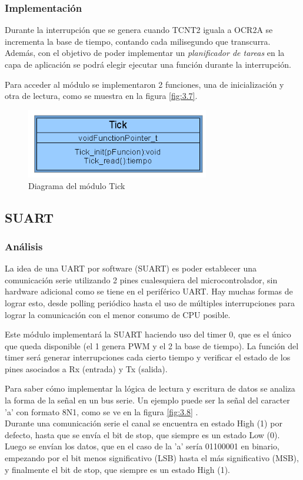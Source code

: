 \subsubsection{Implementación}

Durante la interrupción que se genera cuando TCNT2 iguala a OCR2A se incrementa la base de tiempo, contando cada milisegundo que transcurra. Además, con el objetivo de poder implementar un \textit{planificador de tareas} en la capa de aplicación se podrá elegir ejecutar una función durante la interrupción.

Para acceder al módulo se implementaron 2 funciones, una de inicialización y otra de lectura, como se muestra en la figura \ref{fig:3.7}.

\begin{figure}[!ht]
	\centering
	\includegraphics[width=8cm,scale=1]{resources/3_7-moduloTick.png}
	\caption{Diagrama del módulo Tick}
	\label{fig:\thefigure}
\end{figure}

\subsection{SUART}
\subsubsection{Análisis}
La idea de una UART por software (SUART) es poder establecer una comunicación serie utilizando 2 pines cualesquiera del microcontrolador, sin hardware adicional como se tiene en el periférico UART. Hay muchas formas de lograr esto, desde polling periódico hasta el uso de múltiples interrupciones para lograr la comunicación con el menor consumo de CPU posible. 

Este módulo implementará la SUART haciendo uso del timer 0, que es el único que queda disponible (el 1 genera PWM y el 2 la base de tiempo). La función del timer será generar interrupciones cada cierto tiempo y verificar el estado de los pines asociados a Rx (entrada) y Tx (salida). 

Para saber cómo implementar la lógica de lectura y escritura de datos se analiza la forma de la señal en un bus serie. Un ejemplo puede ser la señal del caracter 'a' con formato 8N1, como se ve en la figura  \ref{fig:3.8} . \\
Durante una comunicación serie el canal se encuentra en estado High (1) por defecto, hasta que se envía el bit de stop, que siempre es un estado Low (0). Luego se envían los datos, que en el caso de la 'a' sería 01100001 en binario, empezando por el bit menos significativo (LSB) hasta el más significativo (MSB), y finalmente el bit de stop, que siempre es un estado High (1). \\

